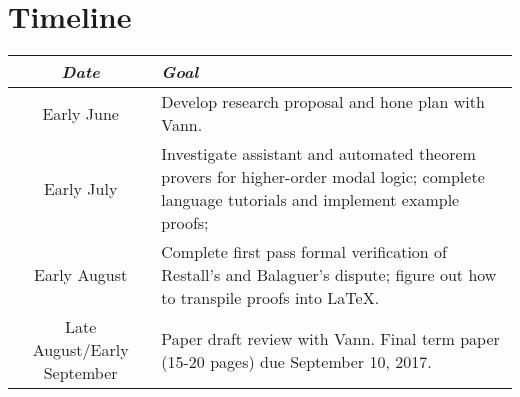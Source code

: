 \documentclass[12pt]{article}
\theoremstyle{definition}
\begin{document}
\section{Timeline}
    \begin{center}
        \begin{tabular}[t]{|c|p{4in}|}
        \hline
        \textit{Date} & \textit{Goal} \\ [0.5ex] \hline\hline
        Early June & Develop research proposal and hone plan with Vann. \\ \hline
        Early July & Investigate assistant and automated theorem provers for
            higher-order modal logic; complete language tutorials and implement
            example proofs;  \\  \hline
        Early August & Complete first pass formal verification of Restall's and
            Balaguer's dispute; figure out how to transpile proofs into LaTeX.
            \\ \hline
        Late August/Early September & Paper draft review with Vann. Final term
        paper (15-20 pages) due September 10, 2017. \\ [1ex] \hline
    \end{tabular}
    \end{center}
\end{document}
